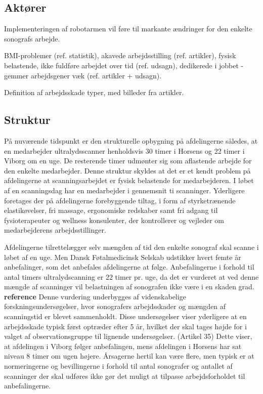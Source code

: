 \subsection{Aktører}
Implementeringen af robotarmen vil føre til markante ændringer for den enkelte sonografs arbejde.

BMI-problemer (ref. statistik), akavede arbejdsstilling (ref. artikler), fysisk belastende, ikke fuldføre arbejdet over tid (ref. udsagn), dedikerede i jobbet - gemmer arbejdsgener væk (ref. artikler + udsagn).

Definition af arbejdsskade typer, med billeder fra artikler. 

\subsection{Struktur}
På nuværende tidspunkt er den strukturelle opbygning på afdelingerne således, at en medarbejder ultralydsscanner henholdsvis 30 timer i Horsens og 22 timer i Viborg om en uge. De resterende timer udmønter sig som aflastende arbejde for den enkelte medarbejder. Denne struktur skyldes at det er et kendt problem på afdelingerne at scanningsarbejdet er fysisk belastende for medarbejderen. I løbet af en scanningsdag har en medarbejder i gennemsnit ti scanninger. Yderligere foretages der på afdelingerne forebyggende tiltag, i form af styrketrænende elastikøvelser, fri massage, ergonomiske redskaber samt fri adgang til fysioterapeuter og wellness konsulenter, der kontrollerer og vejleder om medarbejderens arbejdsstillinger.

Afdelingerne tilrettelægger selv mængden af tid den enkelte sonograf skal scanne i løbet af en uge. Men Dansk Føtalmedicinsk Selskab udstikker hvert femte år anbefalinger, som det anbefales afdelingerne at følge. Anbefalingerne i forhold til antal timers ultralydscanning er 22 timer pr. uge, da det er vurderet at ved denne mængde af scanninger vil belastningen af sonografen ikke være i en skaden grad. \textbf{reference} Denne vurdering underbygges af videnskabelige forskningsundersøgelser, hvor sonografers arbejdsskader og mængden af scanningstid er blevet sammenholdt. Disse undersøgelser viser yderligere at en arbejdsskade typisk først optræder efter 5 år, hvilket der skal tages højde for i valget af observationsgruppe til lignende undersøgelser. (Artikel 35)
Dette viser, at afdelingen i Viborg følger anbefalingen, mens afdelingen i Horsens har sat niveau 8 timer om ugen højere. Årsagerne hertil kan være flere, men typisk er at normeringerne og bevillingerne i forhold til antal sonografer og antallet af scanninger der skal udføres ikke gør det muligt at tilpasse arbejdsforholdet til anbefalingerne. 

